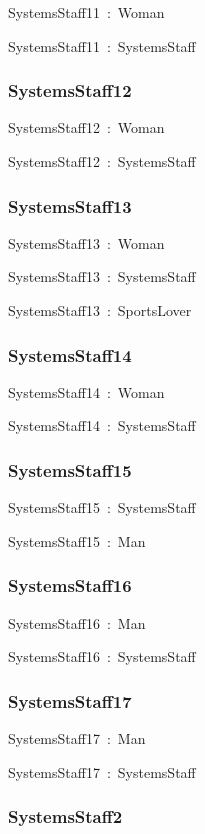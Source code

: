 \documentclass{article}
\begin{document}
SystemsStaff11~:~Woman

SystemsStaff11~:~SystemsStaff

\subsubsection*{SystemsStaff12}

SystemsStaff12~:~Woman

SystemsStaff12~:~SystemsStaff

\subsubsection*{SystemsStaff13}

SystemsStaff13~:~Woman

SystemsStaff13~:~SystemsStaff

SystemsStaff13~:~SportsLover

\subsubsection*{SystemsStaff14}

SystemsStaff14~:~Woman

SystemsStaff14~:~SystemsStaff

\subsubsection*{SystemsStaff15}

SystemsStaff15~:~SystemsStaff

SystemsStaff15~:~Man

\subsubsection*{SystemsStaff16}

SystemsStaff16~:~Man

SystemsStaff16~:~SystemsStaff

\subsubsection*{SystemsStaff17}

SystemsStaff17~:~Man

SystemsStaff17~:~SystemsStaff

\subsubsection*{SystemsStaff2}
\end{document}
